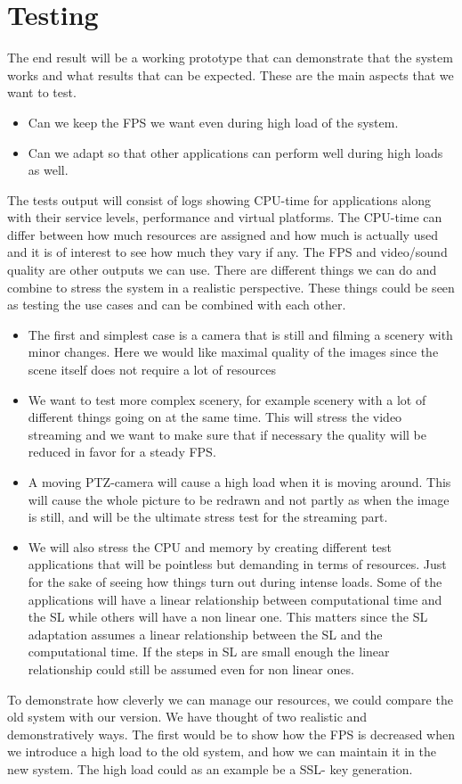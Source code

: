 \documentclass{LTHthesis}
\begin{document}
\chapter{Testing}
The end result will be a working prototype that can demonstrate that the system works and what results that can be expected. These are the main aspects that we want to test.
\begin{itemize}
\item Can we keep the FPS we want even during high load of the system.
\item Can we adapt so that other applications can perform well during high loads as well. 
\end{itemize}

The tests output will consist of logs showing CPU-time for applications along with their service levels, performance and virtual platforms. The CPU-time can differ between how much resources are assigned and how much is actually used and it is of interest to see how much they vary if any. The FPS and video/sound quality are other outputs we can use.
There are different things we can do and combine to stress the system in a realistic perspective. These things could be seen as testing the use cases and can be combined with each other. 
\begin{itemize}

\item The first and simplest case is a camera that is still and filming a scenery with minor changes. Here we would like maximal quality of the images since the scene itself does not require a lot of resources 
\item We want to test more complex scenery, for example scenery with a lot of different things going on at the same time. This will stress the video streaming and we want to make sure that if necessary the quality will be reduced in favor for a steady FPS.
\item A moving PTZ-camera will cause a high load when it is moving around. This will cause the whole picture to be redrawn and not partly as when the image is still, and will be the ultimate stress test for the streaming part.
\item We will also stress the CPU and memory by creating different test applications that will be pointless but demanding in terms of resources. Just for the sake of seeing how things turn out during intense loads. Some of the applications will have a linear relationship between computational time and the SL while others will have a non linear one. This matters since the SL adaptation assumes a linear relationship between the SL and the computational time. If the steps in SL are small enough the linear relationship could still be assumed even for non linear ones.
\end{itemize}
To demonstrate how cleverly we can manage our resources, we could compare the old system with our version. We have thought of two realistic and demonstratively ways. The first would be to show how the FPS is decreased when we introduce a high load to the old system, and how we can maintain it in the new system. The high load could as an example be a SSL- key generation.
\end{document}
